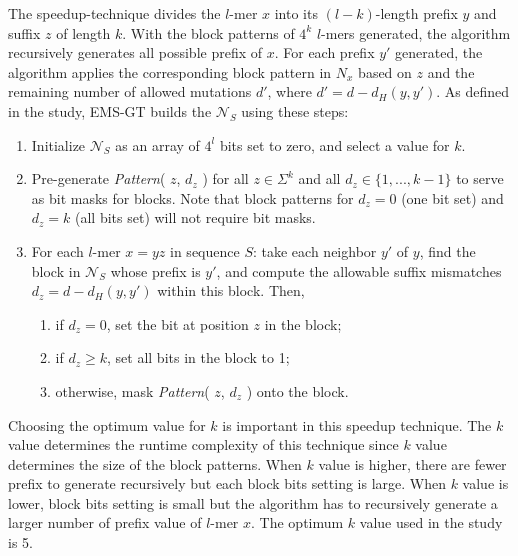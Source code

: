	

	The speedup-technique divides the $l$-mer $x$ into its $(l - k)$-length prefix $y$ and suffix $z$ of length $k$. With the block patterns of $4^k$ $l$-mers generated, the algorithm recursively generates all possible prefix of $x$. For each prefix $y'$ generated, the algorithm applies the corresponding block pattern in $N_x$ based on $z$ and the remaining number of allowed mutations $d'$, where $d' = d - d_H(y, y')$. As defined in the study, EMS-GT builds the $\mathcal{N}_S$ using these steps:

	\begin{enumerate}
		\item Initialize $\mathcal{N}_S$ as an array of $4^l$ bits set to zero, and select a value for $k$.

		\item Pre-generate {\em Pattern}( $z$, $d_z$ ) for all $z \in \Sigma^k$ and all $d_z \in \{1,...,k-1\}$ to serve as bit masks for blocks. Note that block patterns for $d_z=0$ (one bit set) and $d_z=k$ (all bits set) will not require bit masks.

		\item For each $l$-mer $x = yz$ in sequence $S$: take each neighbor $y'$ of $y$, find the block in $\mathcal{N}_S$ whose prefix is $y'$, and compute the allowable suffix mismatches $d_z = d - d_H(y,y')$ within this block. Then,

			\begin{enumerate}
				\item if $d_z = 0$, set the bit at position $z$ in the block;
				\item if $d_z \geq k$, set all bits in the block to 1;
				\item otherwise, mask {\em Pattern}( $z$, $d_z$ ) onto the block.
			\end{enumerate}
	\end{enumerate}

	Choosing the optimum value for $k$ is important in this speedup technique. The $k$ value determines the runtime complexity of this technique since $k$ value determines the size of the block patterns. When $k$ value is higher, there are fewer prefix to generate recursively but each block bits setting is large. When $k$ value is lower, block bits setting is small but the algorithm has to recursively generate a larger number of prefix value of $l$-mer $x$. The optimum $k$ value used in the study is 5.

	

